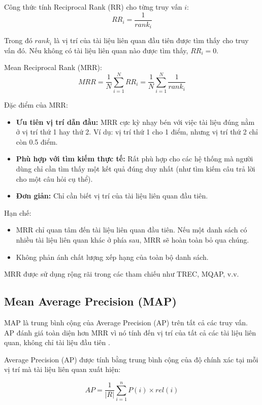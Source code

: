 \documentclass[../BTL.tex]{subfiles}
\begin{document}
Công thức tính Reciprocal Rank (RR) cho từng truy vấn $i$:
$$
RR_i = \frac{1}{rank_i}
$$

Trong đó $rank_i$ là vị trí của tài liệu liên quan đầu tiên được tìm thấy cho truy vấn đó. Nếu không có tài liệu liên quan nào được tìm thấy, $RR_i = 0$.

Mean Reciprocal Rank (MRR):
$$MRR = \frac{1}{N} \sum_{i=1}^{N} RR_i = \frac{1}{N} \sum_{i=1}^{N} \frac{1}{rank_i}$$

Đặc điểm của MRR:
\begin{itemize}
    \item \textbf{Ưu tiên vị trí dẫn đầu:} MRR cực kỳ nhạy bén với việc tài liệu đúng nằm ở vị trí thứ 1 hay thứ 2. Ví dụ: vị trí thứ 1 cho 1 điểm, nhưng vị trí thứ 2 chỉ còn 0.5 điểm.
    
    \item \textbf{Phù hợp với tìm kiếm thực tế:} Rất phù hợp cho các hệ thống mà người dùng chỉ cần tìm thấy một kết quả đúng duy nhất (như tìm kiếm câu trả lời cho một câu hỏi cụ thể).
    
    \item \textbf{Đơn giản:} Chỉ cần biết vị trí của tài liệu liên quan đầu tiên.
\end{itemize}

Hạn chế:
\begin{itemize}
    \item MRR chỉ quan tâm đến tài liệu liên quan đầu tiên. Nếu một danh sách có nhiều tài liệu liên quan khác ở phía sau, MRR sẽ hoàn toàn bỏ qua chúng.
    
    \item Không phản ánh chất lượng xếp hạng của toàn bộ danh sách.
\end{itemize}

MRR được sử dụng rộng rãi trong các tham chiếu như TREC, MQAP, v.v.

\subsection{Mean Average Precision (MAP)}
MAP là trung bình cộng của Average Precision (AP) trên tất cả các truy vấn. AP đánh giá toàn diện hơn MRR vì nó tính đến vị trí của tất cả các tài liệu liên quan, không chỉ tài liệu đầu tiên \cite{manning2008introduction}.

Average Precision (AP) được tính bằng trung bình cộng của độ chính xác tại mỗi vị trí mà tài liệu liên quan xuất hiện:

$$
AP = \frac{1}{|R|}\sum_{i=1}^{n} P(i) \times rel(i)
$$
\end{document}
